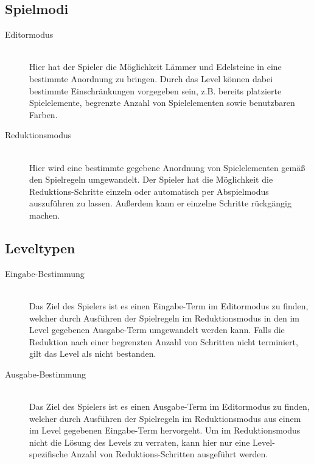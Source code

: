 \subsection{Spielmodi}

\begin{description}
\item[Editormodus] \hfill \\ Hier hat der Spieler die Möglichkeit Lämmer und Edelsteine in eine bestimmte Anordnung zu bringen. Durch das Level können dabei bestimmte Einschränkungen vorgegeben sein, z.B. bereits platzierte Spielelemente, begrenzte Anzahl von Spielelementen sowie benutzbaren Farben.
\item[Reduktionsmodus] \hfill \\ Hier wird eine bestimmte gegebene Anordnung von Spielelementen gemäß den Spielregeln umgewandelt. Der Spieler hat die Möglichkeit die Reduktions-Schritte einzeln oder automatisch per Abspielmodus auszuführen zu lassen. Außerdem kann er einzelne Schritte rückgängig machen.
\end{description}

\subsection{Leveltypen}

\begin{description}
\item[Eingabe-Bestimmung] \hfill \\ Das Ziel des Spielers ist es einen Eingabe-Term im Editormodus zu finden, welcher durch Ausführen  der Spielregeln im Reduktionsmodus in den im Level gegebenen Ausgabe-Term umgewandelt werden kann. Falls die Reduktion nach einer begrenzten Anzahl von Schritten nicht terminiert, gilt das Level als nicht bestanden.
\item[Ausgabe-Bestimmung] \hfill \\ Das Ziel des Spielers ist es einen Ausgabe-Term im Editormodus zu finden, welcher durch Ausführen  der Spielregeln im Reduktionsmodus aus einem im Level gegebenen Eingabe-Term hervorgeht. Um im Reduktionsmodus nicht die Lösung des Levels zu verraten, kann hier nur eine Level-spezifische Anzahl von Reduktions-Schritten ausgeführt werden.
\end{description}